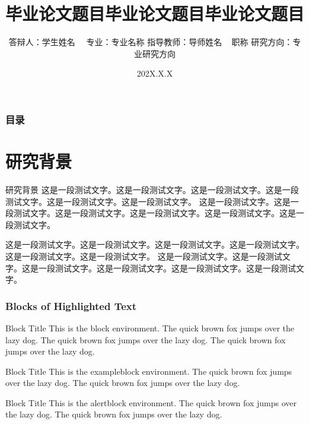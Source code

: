 \documentclass[noamsthm,notheorems,11pt,compress]{beamer}
\title[论文题目]{毕业论文题目毕业论文题目毕业论文题目}
\author[学生姓名]
{
    答辩人：学生姓名~~ \vskip 3mm
    专业：专业名称 \vskip 3mm
    指导教师：导师姓名 ~ 职称 \vskip 3mm
    研究方向：专业研究方向
}
\institute[学校名称]{}
\date[202X.X.X]{202X.X.X}
\numberwithin{figure}{section}
\numberwithin{table}{section}
\numberwithin{equation}{section}
\theoremstyle{plain} %
\newcounter{example}[section]
\begin{document}
\setlength{\baselineskip}{15pt}


{%
\begin{frame}
\titlepage %
\end{frame}}


\begin{frame}
\frametitle{目录}
\tableofcontents
\end{frame}



\section{研究背景}

\begin{frame}{研究背景}
这是一段测试文字。这是一段测试文字。这是一段测试文字。这是一段测试文字。这是一段测试文字。这是一段测试文字。
这是一段测试文字。这是一段测试文字。这是一段测试文字。这是一段测试文字。这是一段测试文字。这是一段测试文字。

\vspace{1ex}
这是一段测试文字。这是一段测试文字。这是一段测试文字。这是一段测试文字。这是一段测试文字。这是一段测试文字。
这是一段测试文字。这是一段测试文字。这是一段测试文字。这是一段测试文字。这是一段测试文字。这是一段测试文字。

\end{frame}


\begin{frame}
\frametitle{Blocks of Highlighted Text}
\begin{block}{Block Title}
This is the block environment. The quick brown fox jumps over the lazy dog. The quick brown fox jumps over the lazy dog. The quick brown fox jumps over the lazy dog.
\end{block}

\begin{exampleblock}{Block Title}
This is the exampleblock environment. The quick brown fox jumps over the lazy dog. The quick brown fox jumps over the lazy dog.
\end{exampleblock}

\begin{alertblock}{Block Title}
This is the alertblock environment. The quick brown fox jumps over the lazy dog. The quick brown fox jumps over the lazy dog.
\end{alertblock}
\end{frame}
\end{document}
